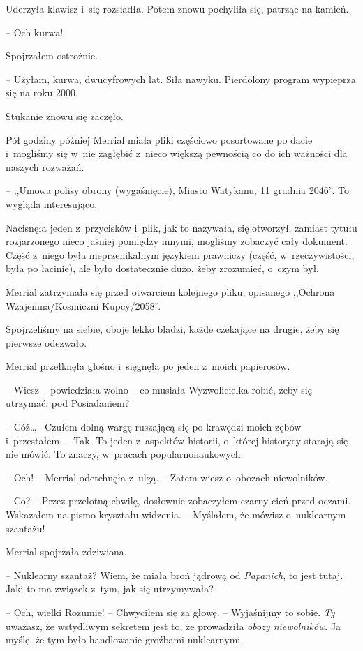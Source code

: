 \documentclass[oneside,polish,11pt,sfheadings]{mwbk}
\begin{document}
Uderzyła klawisz i~się rozsiadła. Potem znowu pochyliła się, patrząc na
kamień.

-- Och kurwa!

Spojrzałem ostrożnie.

-- Użyłam, kurwa, dwucyfrowych lat. Siła nawyku. Pierdolony program
wypieprza się na roku 2000.

Stukanie znowu się zaczęło.

Pół godziny później Merrial miała pliki częściowo posortowane po dacie i~mogliśmy się w~nie zagłębić z~nieco większą pewnością co do ich ważności
dla naszych rozważań.

-- ,,Umowa polisy obrony (wygaśnięcie), Miasto Watykanu, 11 grudnia
2046''. To wygląda interesująco.

Nacisnęła jeden z~przycisków i~plik, jak to nazywała, się otworzył,
zamiast tytułu rozjarzonego nieco jaśniej pomiędzy innymi, mogliśmy
zobaczyć cały dokument. Część z~niego była nieprzenikalnym językiem
prawniczy (część, w~rzeczywistości, była po łacinie), ale było
dostatecznie dużo, żeby zrozumieć, o~czym był.

Merrial zatrzymała się przed otwarciem kolejnego pliku, opisanego
,,Ochrona Wzajemna/Kosmiczni Kupcy/2058''.

Spojrzeliśmy na siebie, oboje lekko bladzi, każde czekające na drugie,
żeby się pierwsze odezwało.

Merrial przełknęła głośno i~sięgnęła po jeden z~moich papierosów.

-- Wiesz -- powiedziała wolno -- co musiała Wyzwolicielka robić, żeby się
utrzymać, pod Posiadaniem?

-- Cóż\ldots -- Czułem dolną wargę ruszającą się po krawędzi moich zębów i~przestałem. -- Tak. To jeden z~aspektów historii, o~której historycy
starają się nie mówić. To znaczy, w~pracach popularnonaukowych.

-- Och! -- Merrial odetchnęła z~ulgą. -- Zatem wiesz o~obozach niewolników.

-- Co? -- Przez przelotną chwilę, dosłownie zobaczyłem czarny cień przed
oczami. Wskazałem na pismo kryształu widzenia. -- Myślałem, że mówisz o~nuklearnym szantażu!

Merrial spojrzała zdziwiona. 

-- Nuklearny szantaż? Wiem, że miała broń
jądrową od \textit{Papanich}, to jest tutaj. Jaki to ma związek z~tym, jak
się utrzymywała?

-- Och, wielki Rozumie! -- Chwyciłem się za głowę. -- Wyjaśnijmy to sobie.
\textit{Ty} uważasz, że wstydliwym sekretem jest to, że prowadziła
\textit{obozy niewolników}. Ja myślę, że tym było handlowanie groźbami
nuklearnymi.
\end{document}
